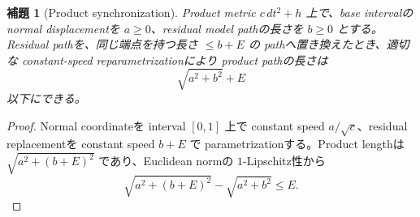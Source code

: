 \documentclass[11pt,a4paper]{ltjsarticle}
\theoremstyle{plain}
\newtheorem{lemma}[lemma]{補題}
\theoremstyle{definition}
\theoremstyle{remark}
\begin{document}
\begin{lemma}[Product synchronization]
\label{lem:product-sync}
Product metric $c\,dt^2+h$ 上で、base intervalの normal displacementを $a\ge0$、residual model pathの長さを $b\ge0$ とする。Residual pathを、同じ端点を持つ長さ $\le b+E$ の pathへ置き換えたとき、適切な constant-speed reparametrizationにより product pathの長さは
\[
 \sqrt{a^2+b^2}+E
\]
以下にできる。
\end{lemma}
\begin{proof}
Normal coordinateを interval $[0,1]$ 上で constant speed $a/\sqrt c$、residual replacementを constant speed $b+E$ で parametrizationする。Product lengthは
$\sqrt{a^2+(b+E)^2}$ であり、Euclidean normの $1$-Lipschitz性から
\[
 \sqrt{a^2+(b+E)^2}-\sqrt{a^2+b^2}\le E.
\]
\end{proof}
\end{document}
